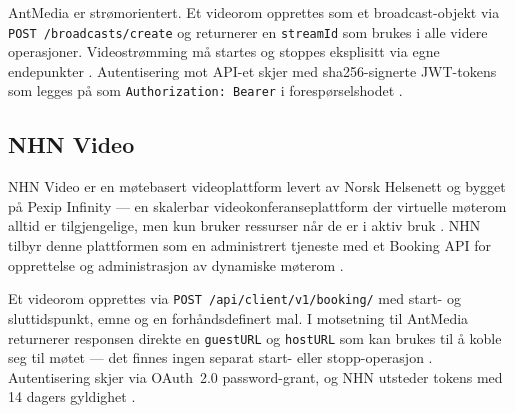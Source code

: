 AntMedia er strømorientert. Et videorom opprettes som et broadcast-objekt via \texttt{POST /broadcasts/create} og returnerer en \texttt{streamId} som brukes i alle videre operasjoner. Videostrømming må startes og stoppes eksplisitt via egne endepunkter \cite{antmedia_rest_examples}. Autentisering mot API-et skjer med \gls{sha256}-signerte JWT-tokens som legges på som \texttt{Authorization: Bearer} i forespørselshodet \cite{antmedia_jwt}.

\subsection{NHN Video}
\label{sec:nhn}

NHN Video er en møtebasert videoplattform levert av Norsk Helsenett og bygget på Pexip Infinity — en skalerbar videokonferanseplattform der virtuelle møterom alltid er tilgjengelige, men kun bruker ressurser når de er i aktiv bruk \cite{pexip_intro}. NHN tilbyr denne plattformen som en administrert tjeneste med et Booking API for opprettelse og administrasjon av dynamiske møterom \cite{nhn_booking}.


Et videorom opprettes via \texttt{POST /api/client/v1/booking/} med start- og sluttidspunkt, emne og en forhåndsdefinert mal. I motsetning til AntMedia returnerer responsen direkte en \texttt{guestURL} og \texttt{hostURL} som kan brukes til å koble seg til møtet — det finnes ingen separat start- eller stopp-operasjon \cite{nhn_booking}. Autentisering skjer via OAuth~2.0 \gls{password-grant}, og NHN utsteder tokens med 14 dagers gyldighet \cite{nhn_booking}.